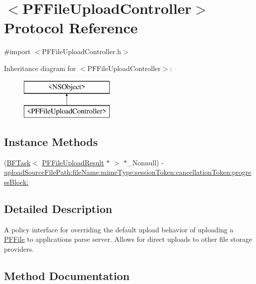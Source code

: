 \hypertarget{protocol_p_f_file_upload_controller-p}{}\section{$<$P\+F\+File\+Upload\+Controller$>$ Protocol Reference}
\label{protocol_p_f_file_upload_controller-p}


{\ttfamily \#import $<$P\+F\+File\+Upload\+Controller.\+h$>$}

Inheritance diagram for $<$P\+F\+File\+Upload\+Controller$>$\+:\begin{figure}[H]
\begin{center}
\leavevmode
\includegraphics[height=2.000000cm]{protocol_p_f_file_upload_controller-p}
\end{center}
\end{figure}
\subsection*{Instance Methods}
\begin{DoxyCompactItemize}
\item 
(\hyperlink{class_b_f_task}{B\+F\+Task}$<$ \hyperlink{interface_p_f_file_upload_result}{P\+F\+File\+Upload\+Result} $\ast$ $>$ $\ast$\+\_\+\+Nonnull) -\/ \hyperlink{protocol_p_f_file_upload_controller-p_ab5c5db7880b0b076ca28459ac51eac78}{upload\+Source\+File\+Path\+:file\+Name\+:mime\+Type\+:session\+Token\+:cancellation\+Token\+:progress\+Block\+:}
\end{DoxyCompactItemize}


\subsection{Detailed Description}
A policy interface for overriding the default upload behavior of uploading a \hyperlink{interface_p_f_file}{P\+F\+File} to application\textquotesingle{}s parse server. Allows for direct uploads to other file storage providers. 

\subsection{Method Documentation}
\hypertarget{protocol_p_f_file_upload_controller-p_ab5c5db7880b0b076ca28459ac51eac78}{}
